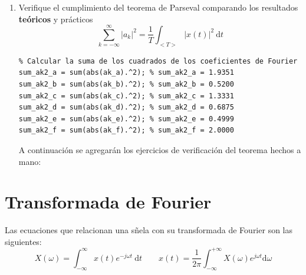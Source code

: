 \documentclass{article}
\newcommand{\dt}{\:\mathrm{d}t}
\begin{document}
\begin{enumerate}[leftmargin=*]
\item Verifique el cumplimiento del teorema de Parseval comparando los resultados \textbf{teóricos} y prácticos \[ \sum_{k=-\infty}^{\infty}|a_k|^2=\dfrac{1}{T}\int_{<T>}|x(t)|^2\dt \]

\begin{lstlisting}
% Calcular la suma de los cuadrados de los coeficientes de Fourier
sum_ak2_a = sum(abs(ak_a).^2); % sum_ak2_a = 1.9351
sum_ak2_b = sum(abs(ak_b).^2); % sum_ak2_b = 0.5200
sum_ak2_c = sum(abs(ak_c).^2); % sum_ak2_c = 1.3331
sum_ak2_d = sum(abs(ak_d).^2); % sum_ak2_d = 0.6875
sum_ak2_e = sum(abs(ak_e).^2); % sum_ak2_e = 0.4999
sum_ak2_f = sum(abs(ak_f).^2); % sum_ak2_f = 2.0000
\end{lstlisting}
A continuación se agregarán los ejercicios de verificación del teorema hechos a mano:
\end{enumerate}



\newpage

\section{Transformada de Fourier}
Las ecuaciones que relacionan una sñela con su transformada de Fourier son las siguientes: \[ X(\omega)=\int_{-\infty}^{\infty}x(t)e^{-j\omega t}\dt\qquad x(t)=\dfrac{1}{2\pi}\int_{-\infty}^{+\infty}X(\omega)e^{j\omega t}\mathrm{d}\omega \]
\end{document}

